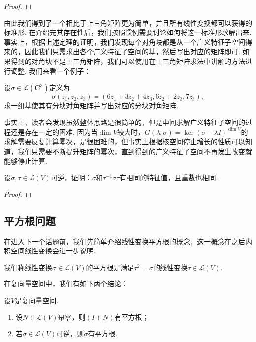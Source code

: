 \begin{proof}

\end{proof}

由此我们得到了一个相比于上三角矩阵更为简单，并且所有线性变换都可以获得的标准形. 在介绍完其存在性后，我们按照惯例需要讨论如何将这一标准形求解出来. 事实上，根据上述定理的证明，我们发现每个对角块都是从一个广义特征子空间得来的，因此我们只需求出各个广义特征子空间的基，然后写出对应的矩阵即可. 如果得到的对角块不是上三角矩阵，我们可以使用在上三角矩阵求法中讲解的方法进行调整. 我们来看一个例子：
\begin{example}
    设$\sigma\in \mathcal{L}(\mathbf{C}^3)$定义为
    \[\sigma(z_1,z_2,z_3)=(6z_1+3z_2+4z_3,6z_2+2z_3,7z_3),\]求一组基使其有分块对角矩阵并写出对应的分块对角矩阵.
\end{example}

\begin{solution}

\end{solution}

事实上，读者会发现虽然整体思路是很简单的，但是中间求解广义特征子空间的过程还是存在一定的困难. 因为当$\dim V$较大时，$G(\lambda,\sigma)=\ker (\sigma-\lambda I)^{\dim V}$的求解需要反复计算幂次，是很困难的，但事实上根据核空间停止增长的性质可以知道，我们只需要不断提升矩阵的幂次，直到得到的广义特征子空间不再发生改变就能够停止计算.

\begin{example}
    设$\sigma,\tau\in \mathcal{L}(V)$可逆，证明：$\sigma$和$\tau^{-1}\sigma\tau$有相同的特征值，且重数也相同.
\end{example}

\begin{proof}

\end{proof}

\subsection{平方根问题}

在进入下一个话题前，我们先简单介绍线性变换平方根的概念，这一概念在之后内积空间线性变换会进一步说明.
\begin{definition}
    我们称线性变换$\sigma\in \mathcal{L}(V)$的平方根是满足$\tau^2=\sigma$的线性变换$\tau\in \mathcal{L}(V)$.
\end{definition}
在复向量空间中，我们有如下两个结论：
\begin{theorem} \label{thm:20:幂零平方根}
    设$V$是复向量空间.
    \begin{enumerate}
        \item 设$N\in \mathcal{L}(V)$幂零，则$(I+N)$有平方根；

        \item \label{item:20:幂零平方根:2}
              若$\sigma\in \mathcal{L}(V)$可逆，则$\sigma$有平方根.
    \end{enumerate}
\end{theorem}

